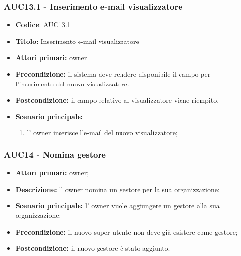 \documentclass[casi-duso]{subfiles}
\begin{document}
\subsubsection{AUC13.1 - Inserimento e-mail visualizzatore}%
\label{subsub:AUC13.1}
\begin{itemize}
  \item \textbf{Codice:} AUC13.1
  \item \textbf{Titolo:} Inserimento e-mail visualizzatore
  \item \textbf{Attori primari:} owner
  \item \textbf{Precondizione:} il sistema deve rendere disponibile il campo per l'inserimento del nuovo visualizzatore.
  \item \textbf{Postcondizione:} il campo relativo al visualizzatore viene riempito.
  \item \textbf{Scenario principale:} 
  \begin{enumerate}
    \item l' owner inserisce l'e-mail del nuovo visualizzatore;
  \end{enumerate}
\end{itemize}

\subsubsection{AUC14 - Nomina gestore}%
\label{subsub:AUC14}
\begin{itemize}
  \item \textbf{Attori primari:} owner;
  \item \textbf{Descrizione:} l' owner nomina un gestore per la sua organizzazione;
  \item \textbf{Scenario principale:} l' owner vuole aggiungere un gestore alla sua organizzazione;
  \item \textbf{Precondizione:} il nuovo super utente non deve già esistere come gestore;
  \item \textbf{Postcondizione:} il nuovo gestore è stato aggiunto.
\end{itemize}
\end{document}
